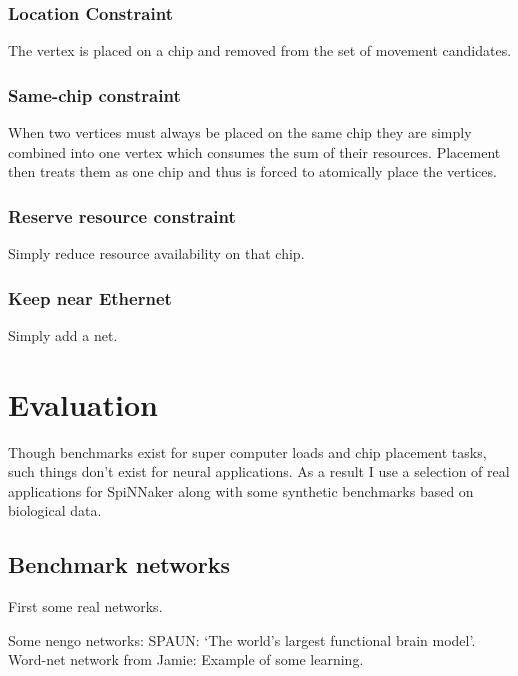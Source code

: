 			\subsubsection{Location Constraint}
				
				The vertex is placed on a chip and removed from the set of movement
				candidates.
			
			\subsubsection{Same-chip constraint}
				
				When two vertices must always be placed on the same chip they are
				simply combined into one vertex which consumes the sum of their
				resources. Placement then treats them as one chip and thus is forced to
				atomically place the vertices.
			
			\subsubsection{Reserve resource constraint}
				
				Simply reduce resource availability on that chip.
			
			\subsubsection{Keep near Ethernet}
				
				Simply add a net.
	
	\section{Evaluation}
		
		\label{sec:placement-results}
		
		Though benchmarks exist for super computer loads and chip placement tasks,
		such things don't exist for neural applications. As a result I use a
		selection of real applications for SpiNNaker along with some synthetic
		benchmarks based on biological data.
		
		\subsection{Benchmark networks}
			
			First some real networks.
			
			Some nengo networks: SPAUN: `The world's largest functional brain model'.
			Word-net network from Jamie: Example of some learning.
			
